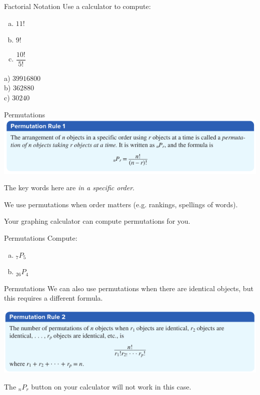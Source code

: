 \documentclass[t, aspectratio=169]{beamer}
\newcommand{\?}{\stackrel{?}{=}}
\begin{document}
	\begin{frame}{Factorial Notation}
		Use a calculator to compute: \begin{enumerate}[a)]
			\item $11!$
			\item $9!$
			\item $\dfrac{10!}{5!}$ \pause
		\end{enumerate}
		
		a) $39916800$ \pause \\
		b) $362880$ \pause \\
		c) $30240$ 
	\end{frame}

	\begin{frame}{Permutations}
		\includegraphics[width=\textwidth]{permutation.png} \pause
		
		The key words here are \textit{in a specific order}. \pause
		
		We use permutations when order matters (e.g. rankings, spellings of words). \pause
		
		Your graphing calculator can compute permutations for you.
	\end{frame}

	\begin{frame}{Permutations}
		Compute: \begin{enumerate}[a)]
			\item $_7 P _5$
			\item $_{26} P _4$
		\end{enumerate}
	
	\end{frame}

	\begin{frame}{Permutations}
		We can also use permutations when there are identical objects, but this requires a different formula.
		
		\includegraphics[width=\textwidth]{permutation2.png} \pause
		
		The $_n P _r$ button on your calculator will not work in this case.
	\end{frame}
\end{document}
